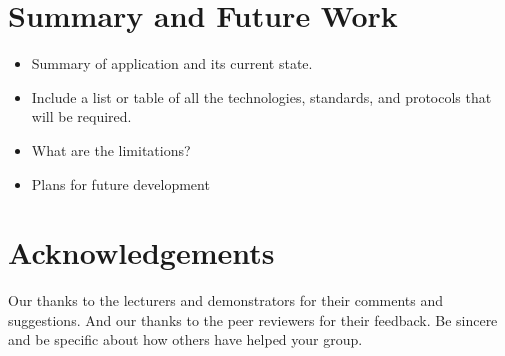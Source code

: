 \documentclass{sig-alt-release2}
\begin{document}
\section{Summary and Future Work}
\begin{itemize}
\item	Summary of application and its current state.
\item	Include a list or table of all the technologies, standards, and protocols that will be required.
\item	What are the limitations?
\item Plans for future development
\end{itemize}

\section{Acknowledgements}
Our thanks to the lecturers and demonstrators for their comments and suggestions. And our thanks to the peer reviewers for their feedback.
Be sincere and be specific about how others have helped your group.



\end{document}
